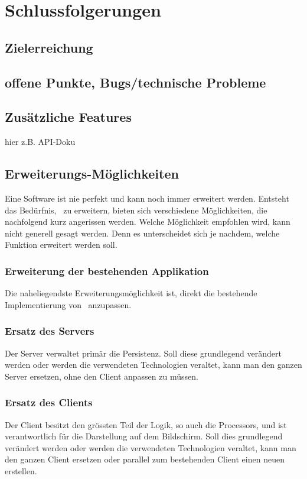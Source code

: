 \chapter{Schlussfolgerungen}
	
	\section{Zielerreichung}
	
	\section{offene Punkte, Bugs/technische Probleme}
	
	
	\section{Zusätzliche Features}
	hier z.B. API-Doku
	
	
	
	\section{Erweiterungs-Möglichkeiten}
		Eine Software ist nie perfekt und kann noch immer erweitert werden.
		Entsteht das Bedürfnis, \eeppi\ zu erweitern, bieten sich verschiedene Möglichkeiten, die nachfolgend kurz angerissen werden.
		Welche Möglichkeit empfohlen wird, kann nicht generell gesagt werden.
		Denn es unterscheidet sich je nachdem, welche Funktion erweitert werden soll.

		\subsection{Erweiterung der bestehenden Applikation}
			Die naheliegendste Erweiterungsmöglichkeit ist, direkt die bestehende Implementierung von \eeppi\ anzupassen.
	
		\subsection{Ersatz des Servers}
			Der Server verwaltet primär die Persistenz.
			Soll diese grundlegend verändert werden oder werden die verwendeten Technologien veraltet,
			kann man den ganzen Server ersetzen, ohne den Client anpassen zu müssen.
	
		\subsection{Ersatz des Clients}
			Der Client besitzt den grössten Teil der Logik, so auch die Processors,
			und ist verantwortlich für die Darstellung auf dem Bildschirm.
			Soll dies grundlegend verändert werden oder werden die verwendeten Technologien veraltet,
			kann man den ganzen Client ersetzen oder parallel zum bestehenden Client einen neuen erstellen.

